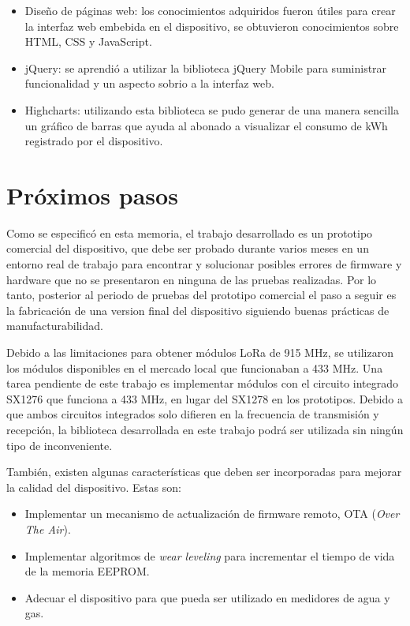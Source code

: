 \begin{itemize}
	\item Diseño de páginas web: los conocimientos adquiridos fueron útiles para crear la interfaz web embebida en el dispositivo, se obtuvieron conocimientos sobre HTML, CSS y JavaScript.
	\item jQuery: se aprendió a utilizar la biblioteca jQuery Mobile para suministrar funcionalidad y un aspecto sobrio a la interfaz web.
	\item Highcharts: utilizando esta biblioteca se pudo generar de una manera sencilla un gráfico de barras que ayuda al abonado a visualizar el consumo de kWh registrado por el dispositivo.
\end{itemize}

\section{Próximos pasos}

Como se especificó en esta memoria, el trabajo desarrollado es un prototipo comercial del dispositivo, que debe ser probado durante varios meses en un entorno real de trabajo para encontrar y solucionar posibles errores de firmware y hardware que no se presentaron en ninguna de las pruebas realizadas. Por lo tanto, posterior al periodo de pruebas del prototipo comercial el paso a seguir es la fabricación de una version final del dispositivo siguiendo buenas prácticas de manufacturabilidad.

Debido a las limitaciones para obtener módulos LoRa de 915 MHz, se utilizaron los módulos disponibles en el mercado local que funcionaban a 433 MHz. Una tarea pendiente de este trabajo es implementar módulos con el circuito integrado SX1276 que funciona a 433 MHz, en lugar del SX1278 en los prototipos. Debido a que ambos circuitos integrados solo difieren en la frecuencia de transmisión y recepción, la biblioteca desarrollada en este trabajo podrá ser utilizada sin ningún tipo de inconveniente.

También, existen algunas características que deben ser incorporadas para mejorar la calidad del dispositivo. Estas son:

\begin{itemize}
	\item Implementar un mecanismo de actualización de firmware remoto, OTA (\textit{Over The Air}).
	\item Implementar algoritmos de \textit{wear leveling} para incrementar el tiempo de
	 vida de la memoria EEPROM.
	\item Adecuar el dispositivo para que pueda ser utilizado en medidores de agua y gas.
\end{itemize}
